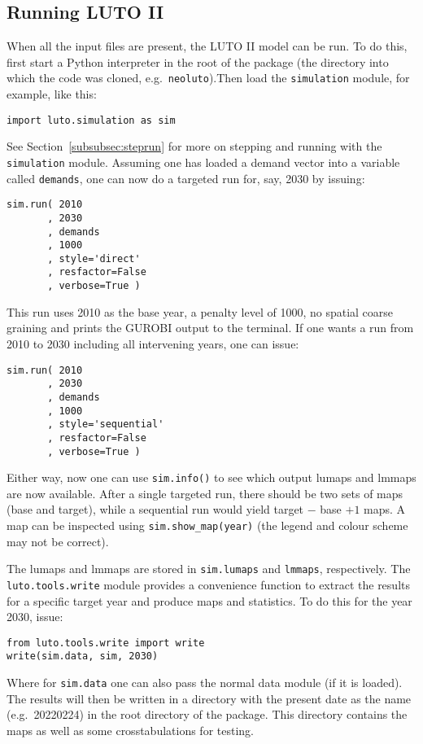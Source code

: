\documentclass[12pt,a4paper,twoside]{article}
\begin{document}
\subsection{Running LUTO II}
When all the input files are present, the LUTO II model can be run. To do this, first start a Python interpreter in the root of the package (the directory into which the code was cloned, e.g.\ \texttt{neoluto}).Then load the \texttt{simulation} module, for example, like this:
\begin{verbatim}
import luto.simulation as sim
\end{verbatim}
See Section~\ref{subsubsec:steprun} for more on stepping and running with the \texttt{simulation} module. Assuming one has loaded a demand vector into a variable called \texttt{demands}, one can now do a targeted run for, say, 2030 by issuing:
\begin{verbatim}
sim.run( 2010
       , 2030
       , demands
       , 1000
       , style='direct'
       , resfactor=False
       , verbose=True )
\end{verbatim}
This run uses 2010 as the base year, a penalty level of 1000, no spatial coarse graining and prints the GUROBI output to the terminal. If one wants a run from 2010 to 2030 including all intervening years, one can issue:
\begin{verbatim}
sim.run( 2010
       , 2030
       , demands
       , 1000
       , style='sequential'
       , resfactor=False
       , verbose=True )
\end{verbatim}
Either way, now one can use \texttt{sim.info()} to see which output lumaps and lmmaps are now available. After a single targeted run, there should be two sets of maps (base and target), while a sequential run would yield target $-$ base $+1$ maps. A map can be inspected using \texttt{sim.show_map(year)} (the legend and colour scheme may not be correct).

The lumaps and lmmaps are stored in \texttt{sim.lumaps} and \texttt{lmmaps}, respectively. The \texttt{luto.tools.write} module provides a convenience function to extract the results for a specific target year and produce maps and statistics. To do this for the year 2030, issue:
\begin{verbatim}
from luto.tools.write import write
write(sim.data, sim, 2030)
\end{verbatim}
Where for \texttt{sim.data} one can also pass the normal data module (if it is loaded). The results will then be written in a directory with the present date as the name (e.g.\ 20220224) in the root directory of the package. This directory contains the maps as well as some crosstabulations for testing.
\end{document}
